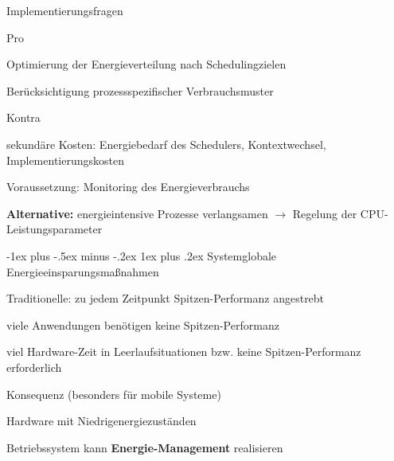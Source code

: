 \documentclass[a4paper]{article}
\makeatletter
\renewcommand{\subsubsection}{\@startsection{subsubsection}{3}{0mm}%
 {-1ex plus -.5ex minus -.2ex}%
 {1ex plus .2ex}%
 {\normalfont\small\bfseries}}
\makeatother
\begin{document}
\begin{multicols}{3}
    Implementierungsfragen
    \begin{itemize*}
        \item Pro
        \begin{itemize*}
            \item Optimierung der Energieverteilung nach Schedulingzielen
            \item Berücksichtigung prozessspezifischer Verbrauchsmuster
        \end{itemize*}
        \item Kontra
        \begin{itemize*}
            \item sekundäre Kosten: Energiebedarf des Schedulers, Kontextwechsel, Implementierungskosten
            \item Voraussetzung: Monitoring des Energieverbrauchs
        \end{itemize*}
        \item \textbf{Alternative:} energieintensive Prozesse verlangsamen $\rightarrow$ Regelung der CPU-Leistungsparameter
    \end{itemize*}

    \subsubsection{Systemglobale Energieeinsparungsmaßnahmen}
    \begin{itemize*}
        \item Traditionelle: zu jedem Zeitpunkt Spitzen-Performanz angestrebt
        \begin{itemize*}
            \item viele Anwendungen benötigen keine Spitzen-Performanz
            \item viel Hardware-Zeit in Leerlaufsituationen bzw. keine Spitzen-Performanz erforderlich
        \end{itemize*}
        \item Konsequenz (besonders für mobile Systeme)
        \begin{itemize*}
            \item Hardware mit Niedrigenergiezuständen
            \item Betriebssystem kann \textbf{Energie-Management} realisieren
        \end{itemize*}
    \end{itemize*}


\end{multicols}
\end{document}
